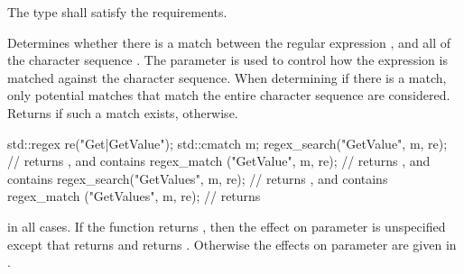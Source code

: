 \begin{itemdescr}
\pnum
\requires
The type  shall satisfy the
 requirements.

\pnum
\effects  Determines whether there is a match between the
regular expression , and all of the character
sequence . The parameter  is
used to control how the expression is matched against the character
sequence. When determining if there is a match, only potential matches
that match the entire character sequence are considered.
Returns  if such a match exists, 
otherwise.
\begin{example}
\begin{codeblock}
std::regex re("Get|GetValue");
std::cmatch m;
regex_search("GetValue", m, re);	// returns , and  contains 
regex_match ("GetValue", m, re);	// returns , and  contains 
regex_search("GetValues", m, re);	// returns , and  contains 
regex_match ("GetValues", m, re);	// returns 
\end{codeblock}
\end{example}

\pnum
\ensures
{} in all cases.
If the function returns , then the effect
on parameter  is unspecified except that 
returns  and  returns .
Otherwise the effects on parameter  are given in
.
\end{itemdescr}

